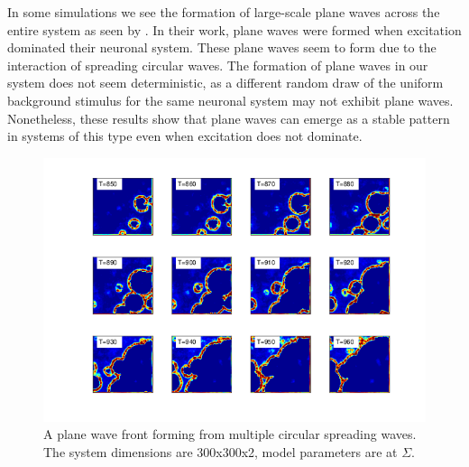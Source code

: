 \documentclass[12pt]{article}
\begin{document}
In some simulations we see the formation of large-scale plane waves across the entire system as seen by \parencite{keane2015}.
In their work, plane waves were formed when excitation dominated their neuronal system.
These plane waves seem to form due to the interaction of spreading circular waves.
The formation of plane waves in our system does not seem deterministic, as a different random draw of the uniform background stimulus for the same neuronal system may not exhibit plane waves.
Nonetheless, these results show that plane waves can emerge as a stable pattern in systems of this type even when excitation does not dominate.
\begin{figure}[!htb]
 \caption{ A plane wave front forming from multiple circular spreading waves.
          The system dimensions are 300x300x2, model parameters are at $\Sigma$.
          }
 \label{fig:2D_plane_wave}
 \centering
   \includegraphics[width=\textwidth]{fig/2DPlaneWave}
\end{figure}
\FloatBarrier
\end{document}
